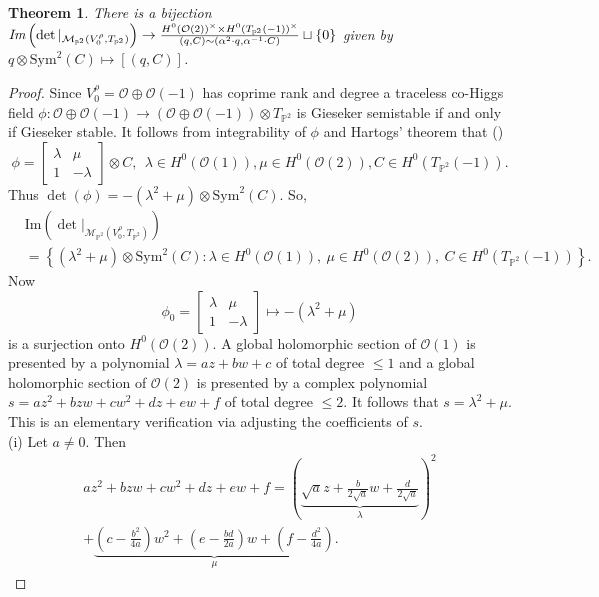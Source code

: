 \documentclass[12pt]{amsart}
\newtheorem{theorem}{Theorem}[subsection]
\theoremstyle{definition}
\theoremstyle{remark}
\numberwithin{equation}{section}
\begin{document}
\begin{theorem}\label{det1}
There is a bijection $\emph{Im}\left(\det|_{\mathcal{M}_{\mathbb{P}^2}(V_0^\rho, T_{\mathbb{P}^2})}\right)\to\frac{H^0(\mathcal{O}(2))^\times\times H^0(T_{\mathbb{P}^2}(-1))^\times}{(q, C)\sim (\alpha^2\cdot q, \alpha^{-1}\cdot C)}\sqcup\{0\}$ given by $q\otimes\mbox{Sym}^2(C)\mapsto [(q, C)]$.
\end{theorem}
\begin{proof}
Since $V_0^\rho = \mathcal{O}\oplus\mathcal{O}(-1)$ has coprime rank and degree a traceless co-Higgs field $\phi:\mathcal{O}\oplus\mathcal{O}(-1)\to \left(\mathcal{O}\oplus\mathcal{O}(-1)\right)\otimes T_{\mathbb{P}^2}$ is Gieseker semistable if and only if Gieseker stable. It follows from integrability of $\phi$ and Hartogs' theorem that (\cite{Rayan}) 
\begin{equation}
\phi = \begin{bmatrix}
    \lambda & \mu\\
    1 & -\lambda
\end{bmatrix}\otimes C,~~ \lambda\in H^0(\mathcal{O}(1)), \mu\in H^0(\mathcal{O}(2)), C\in H^0(T_{\mathbb{P}^2}(-1)).
\end{equation}
Thus $\det(\phi) = -(\lambda^2 + \mu)\otimes\mbox{Sym}^2(C)$. So,
\begin{align*}
&\mbox{Im}\left(\det|_{\mathcal{M}_{\mathbb{P}^2}(V_0^\rho, T_{\mathbb{P}^2})}\right) \\
& = \left\{(\lambda^2 + \mu)\otimes\mbox{Sym}^2(C):\lambda\in H^0(\mathcal{O}(1)),~\mu\in H^0(\mathcal{O}(2)),~ C\in H^0(T_{\mathbb{P}^2}(-1))\right\}.
\end{align*}
Now
\begin{equation}
\phi_0 = \begin{bmatrix}
    \lambda & \mu\\
    1 & -\lambda
\end{bmatrix}\mapsto -(\lambda^2 + \mu)
\end{equation} is a surjection onto $H^0(\mathcal{O}(2))$. A global holomorphic section of $\mathcal{O}(1)$ is presented by a polynomial $\lambda = az + bw + c$ of total degree $\leq 1$ and a global holomorphic section of $\mathcal{O}(2)$ is presented by a complex polynomial $s = az^2 + bzw + cw^2 + dz + ew + f$ of total degree $\leq 2$. It follows that $s = \lambda^2 + \mu$. This is an elementary verification via adjusting the coefficients of $s$.\\

(i) Let $a\neq 0$. Then 
\begin{align*}
az^2 + bzw + cw^2 + dz + ew + f = \left(\underbrace{\sqrt{a}z + \frac{b}{2\sqrt{a}}w + \frac{d}{2\sqrt{a}}}_{\lambda}\right)^2\\ + \underbrace{\left(c - \frac{b^2}{4a}\right)w^2 + \left(e - \frac{bd}{2a}\right)w + \left(f - \frac{d^2}{4a}\right)}_{\mu}.
\end{align*}


\end{proof}
\end{document}
